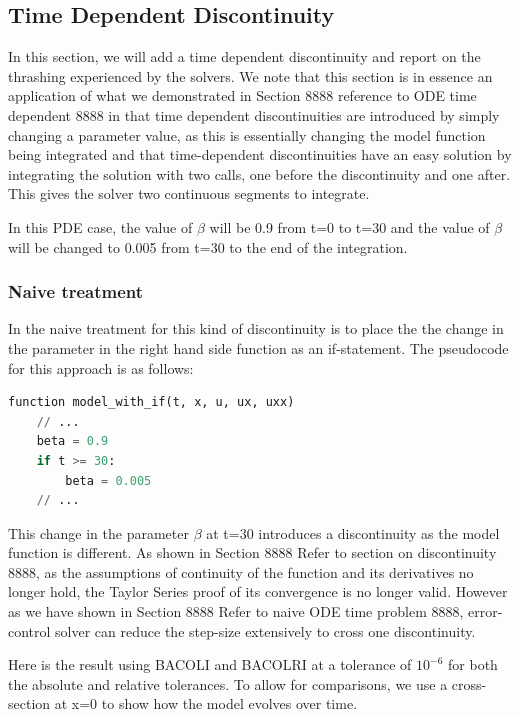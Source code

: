 \documentclass{article}
\begin{document}
\subsection{Time Dependent Discontinuity}
In this section, we will add a time dependent discontinuity and report on the thrashing experienced by the solvers. We note that this section is in essence an application of what we demonstrated in Section 8888 reference to ODE time dependent 8888 in that time dependent discontinuities are introduced by simply changing a parameter value, as this is essentially changing the model function being integrated and that time-dependent discontinuities have an easy solution by integrating the solution with two calls, one before the discontinuity and one after. This gives the solver two continuous segments to integrate.

In this PDE case, the value of $\beta$ will be 0.9 from t=0 to t=30 and the value of $\beta$ will be changed to 0.005 from t=30 to the end of the integration.

\subsubsection{Naive treatment}
In the naive treatment for this kind of discontinuity is to place the the change in the parameter in the right hand side function as an if-statement. The pseudocode for this approach is as follows:

\begin{minipage}{\linewidth}
\begin{lstlisting}[language=Python]
function model_with_if(t, x, u, ux, uxx)
    // ...
    beta = 0.9
    if t >= 30:
        beta = 0.005
    // ...

\end{lstlisting}
\end{minipage}

This change in the parameter $\beta$ at t=30 introduces a discontinuity as the model function is different. As shown in Section 8888 Refer to section on discontinuity 8888, as the assumptions of continuity of the function and its derivatives no longer hold, the Taylor Series proof of its convergence is no longer valid. However as we have shown in Section 8888 Refer to naive ODE time problem 8888, error-control solver can reduce the step-size extensively to cross one discontinuity.

Here is the result using BACOLI and BACOLRI at a tolerance of $10^{-6}$ for both the absolute and relative tolerances. To allow for comparisons, we use a cross-section at x=0 to show how the model evolves over time.
\end{document}
